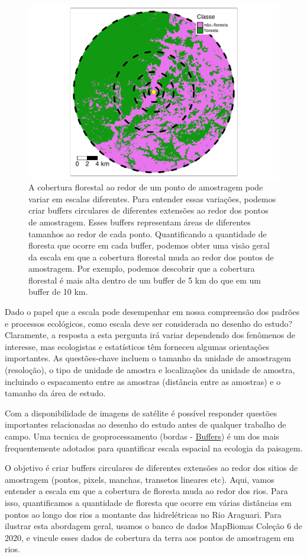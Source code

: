 \documentclass[
]{article}
\begin{document}
\begin{figure}
\includegraphics[width=0.6\linewidth,height=0.6\textheight]{epr_files/figure-latex/buffer-figure-1} \caption{A cobertura florestal ao redor de um ponto de amostragem pode variar em escalas diferentes. Para entender essas variações, podemos criar buffers circulares de diferentes extensões ao redor dos pontos de amostragem. Esses buffers representam áreas de diferentes tamanhos ao redor de cada ponto. Quantificando a quantidade de floresta que ocorre em cada buffer, podemos obter uma visão geral da escala em que a cobertura florestal muda ao redor dos pontos de amostragem. Por exemplo, podemos descobrir que a cobertura florestal é mais alta dentro de um buffer de 5 km do que em um buffer de 10 km.}\label{fig:buffer-figure}
\end{figure}

Dado o papel que a escala pode desempenhar em nossa compreensão dos padrões e processos ecológicos, como escala deve ser considerada no desenho do estudo? Claramente, a resposta a esta pergunta irá variar dependendo dos fenômenos de interesse, mas ecologistas e estatísticos têm forneceu algumas orientações importantes. As questões-chave incluem o tamanho da unidade de amostragem (resoloção), o tipo de unidade de amostra e localizações da unidade de amostra, incluindo o espacamento entre as amostras (distância entre as amostras) e o tamanho da área de estudo.

Com a disponibilidade de imagens de satélite é possível responder questões importantes relacionadas ao desenho do estudo antes de qualquer trabalho de campo. Uma tecnica de geoprocessamento (bordas - \href{https://docs.qgis.org/3.16/pt_BR/docs/gentle_gis_introduction/vector_spatial_analysis_buffers.html}{Buffers}) é um dos mais frequentemente adotados para quantificar escala espacial na ecologia da paisagem.

O objetivo é criar buffers circulares de diferentes extensões ao redor dos sitios de amostragem (pontos, pixels, manchas, transetos lineares etc). Aqui, vamos entender a escala em que a cobertura de floresta muda ao redor dos rios. Para isso, quantificamos a quantidade de floresta que ocorre em várias distâncias em pontos ao longo dos rios a montante das hidrelétricas no Rio Araguari. Para ilustrar esta abordagem geral, usamos o banco de dados MapBiomas Coleção 6 de 2020, e vincule esses dados de cobertura da terra aos pontos de amostragem em rios.
\end{document}
